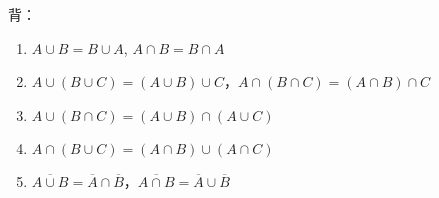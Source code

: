 \documentclass[lang=cn,10pt,thmcnt=section]{elegantbook}
\begin{document}
背：
\begin{enumerate}
    \item $A \cup B = B \cup A$, $A \cap B = B \cap A$
    \item $A \cup (B \cup C) = (A \cup B) \cup C$，$A \cap (B \cap C) = (A \cap B) \cap C$
    \item $A \cup (B \cap C) = (A \cup B) \cap (A \cup C)$
    \item $A \cap (B \cup C) = (A \cap B) \cup (A \cap C)$
    \item $\overline{A \cup B} = \overline{A} \cap \overline{B}$，$\overline{A \cap B} = \overline{A} \cup \overline{B}$
\end{enumerate}
\end{document}
